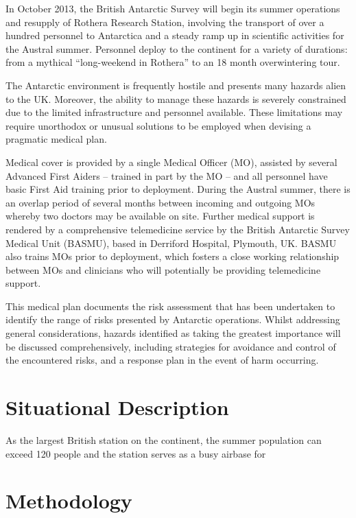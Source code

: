 \documentclass[12pt,a4paper]{article}
\begin{document}
In October 2013, the British Antarctic Survey will begin its summer operations and resupply of Rothera Research Station, involving the transport of over a hundred personnel to Antarctica and a steady ramp up in scientific activities for the Austral summer. Personnel deploy to the continent for a variety of durations: from a mythical ``long-weekend in Rothera'' to an 18 month overwintering tour.

The Antarctic environment is frequently hostile and presents many hazards alien to the UK. Moreover, the ability to manage these hazards is severely constrained due to the limited infrastructure and personnel available. These limitations may require unorthodox or unusual solutions to be employed when devising a pragmatic medical plan.

Medical cover is provided by a single Medical Officer (MO), assisted by several Advanced First Aiders -- trained in part by the MO -- and all personnel have basic First Aid training prior to deployment. During the Austral summer, there is an overlap period of several months between incoming and outgoing MOs whereby two doctors may be available on site. Further medical support is rendered by a comprehensive telemedicine service by the British Antarctic Survey Medical Unit (BASMU), based in Derriford Hospital, Plymouth, UK. BASMU also trains MOs prior to deployment, which fosters a close working relationship between MOs and clinicians who will potentially be providing telemedicine support.

This medical plan documents the risk assessment that has been undertaken to identify the range of risks presented by Antarctic operations. Whilst addressing general considerations, hazards identified as taking the greatest importance will be discussed comprehensively, including strategies for avoidance and control of the encountered risks, and a response plan in the event of harm occurring.

\section{Situational Description}

As the largest British station on the continent, the summer population can exceed 120 people and the station serves as a busy airbase for

\section{Methodology}
\end{document}
